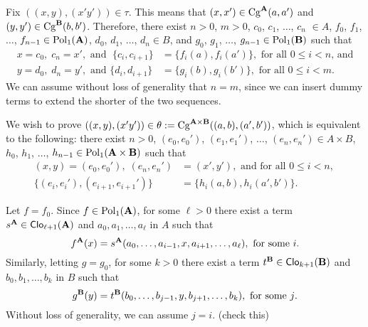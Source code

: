 Fix $((x,y),(x'y')) \in \tau$. This means that
$(x,x') \in \operatorname{Cg}^{\mathbf{A}}(a,a')$ and $(y,y')\in \operatorname{Cg}^{\mathbf{B}}(b,b')$.
Therefore, there exist $n>0$, $m>0$, 
$c_0$, $c_1$, $\dots$, $c_n$ $\in A$, $f_0$, $f_1$, $\dots$,
$f_{n-1} \in \operatorname{Pol}_1(\mathbf{A})$, $d_0$, $d_1$, $\dots$, $d_n\in B$, and $g_0$, $g_1$, $\dots$,
$g_{n-1} \in \operatorname{Pol}_1(\mathbf{B})$ such that 
\begin{align*}
  x = c_0, \; c_n=x', \text{ and } \; \{c_i, c_{i+1}\} &= \{f_i(a), f_i(a')\},
  \text{ for all $0\leq i < n$, and}\\
  y = d_0, \; d_n=y',  \text{ and }  
  \{d_i, d_{i+1}\} &= \{g_i(b), g_i(b')\}, \text{ for all $0\leq i < m$.}
\end{align*}
We can assume without loss of generality that $n=m$, since we can insert dummy
terms to extend the shorter of the two sequences.

We wish to prove $((x,y),(x'y')) \in \theta:= \operatorname{Cg}^{\mathbf{A} \times \mathbf{B}}((a, b), (a', b'))$,
which is equivalent to the following: there exist $n>0$, 
$(e_0, e_0')$, $(e_1,e_1')$, $\dots$, $(e_n, e_n') \in A\times B$, 
$h_0$, $h_1$, $\dots$, $h_{n-1} \in \operatorname{Pol}_1(\mathbf{A}\times \mathbf{B})$ such that
\begin{align*}
  (x,y) = (e_0,e_0'), \; (e_n, e_n') &=(x',y'), \text{ and for all $0\leq i < n$, } \\
  \{(e_i, e_i'), (e_{i+1}, e_{i+1}')\} &= \{h_i(a,b), h_i(a',b')\}.
\end{align*}


Let $f = f_0$.  Since $f\in \operatorname{Pol}_1(\mathbf{A})$, for some $\ell>0$ there
exist a term $s^{\mathbf{A}} \in \operatorname{\mathsf{Clo}}_{\ell+1}(\mathbf{A})$ and $a_0, a_1, \dots, a_\ell$ in $A$ such that
\[
f^{\mathbf{A}}(x) = s^{\mathbf{A}}(a_0, \dots, a_{i-1}, x, a_{i+1}, \dots, a_\ell), \text{ for some $i$.}
\]
Similarly, letting $g = g_0$, for some $k>0$ there
exist a term $t^{\mathbf{B}} \in \operatorname{\mathsf{Clo}}_{k+1}(\mathbf{B})$ and $b_0, b_1, \dots, b_k$ in $B$ such that
\[
g^{\mathbf{B}}(y) = t^{\mathbf{B}}(b_0, \dots, b_{j-1}, y, b_{j+1}, \dots, b_k), \text{ for some $j$.}
\]
Without loss of generality, we can assume $j=i$. (check this)

